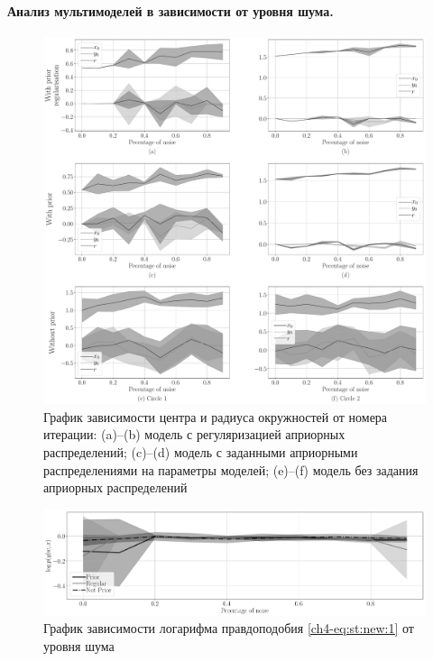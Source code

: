 \paragraph{Анализ мультимоделей в зависимости от уровня шума.} 
\begin{figure}[h!t]\center
\includegraphics[width=1\textwidth]{results/priorexpert/experiment_synthetic_param_progress_noise}
\caption{График зависимости центра и радиуса окружностей от номера итерации: (a)--(b) модель с регуляризацией априорных распределений; (c)--(d) модель с заданными априорными распределениями на параметры моделей; (e)--(f) модель без задания априорных распределений}
\label{ch4-experiment:st:3:1}
\end{figure}

\begin{figure}[h!t]\center
\includegraphics[width=1\textwidth]{results/priorexpert/experiment_synt_likelihood_progress_noise}
\caption{График зависимости логарифма правдоподобия \eqref{ch4-eq:st:new:1} от уровня шума
}
\label{ch4-experiment:st:3:2}
\end{figure}

